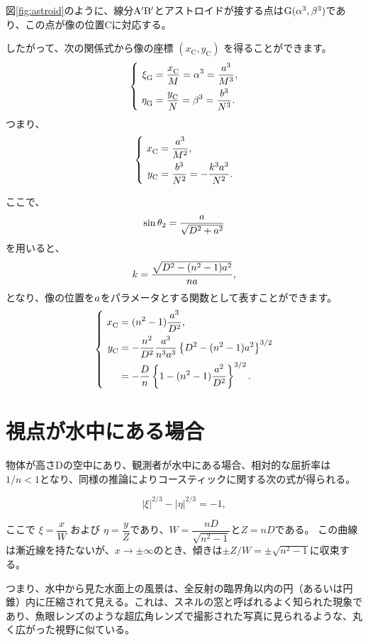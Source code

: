 \documentclass[twocolumn]{article}
\begin{document}
	図\ref{fig:astroid}のように、線分${\mathrm{{A^{\prime}}{B^{\prime}}}}$とアストロイドが接する点は$\mathrm{G}({\alpha}^3, {\beta}^3)$であり、この点が像の位置$\mathrm{C}$に対応する。
	
	したがって、次の関係式から像の座標 $(x_{\mathrm{C}}^{}, y_{\mathrm{C}}^{})$ を得ることができます。
	$$ \left\{ 
	\begin{aligned}
		\xi_{\mathrm{G}}^{} &= \dfrac{x_{\mathrm{C}}^{}}{M} = \greeka^3 = \dfrac{\romana^3}{M^3},\\
		\eta_{\mathrm{G}}^{} &= \dfrac{y_{\mathrm{C}}^{}}{N} = \greekb^3 = \dfrac{\romanb^3}{N^3}.
	\end{aligned}
	\right.$$
	つまり、
	$$ \left\{ 
	\begin{aligned}
		x_{\mathrm{C}}^{} &= \dfrac{\romana^3}{M^2},\\
		y_{\mathrm{C}}^{} &= \dfrac{\romanb^3}{N^2}=-\dfrac{k^3\romana^3}{N^2}.
	\end{aligned}
	\right.$$
	
	ここで、
	$$\sin\theta_2 = \dfrac{{a}}{\sqrt{D^2+{a}^2}}$$
	を用いると、
	$$k = \dfrac{\sqrt{D^2-(n^2-1){a}^2}}{n{a}},$$
	となり、像の位置を${a}$をパラメータとする関数として表すことができます。
	$$ \left\{ 
	\begin{aligned}
		x_{\mathrm{C}}^{} &= (n^2-1)\dfrac{\romana^3}{D^2},\\
		y_{\mathrm{C}}^{} &= -\dfrac{n^2}{D^2}\dfrac{\romana^3}
		{n^3\romana^3}\left\{ D^2-(n^2-1)\romana^2 \right\}^{3/2}\\
		&=-\dfrac{D}{n}\left\{ 1-(n^2-1)\dfrac{\romana^2}{D^2} \right\}^{3/2}.
	\end{aligned}
	\right.$$
	
	\section{視点が水中にある場合}
	
	物体が高さDの空中にあり、観測者が水中にある場合、相対的な屈折率は$1/n < 1$となり、同様の推論によりコースティックに関する次の式が得られる。
	
	$$ \left| \xi \right|^{2/3} - \left| \eta \right|^{2/3} = -1, $$
	
	ここで $\xi = \dfrac{x}{W} $ および $\eta = \dfrac{y}{Z}$であり、$W = \dfrac{nD}{\sqrt{n^2-1}}$と$Z = nD$である。	
	この曲線は漸近線を持たないが、$x \to \pm\infty$のとき、傾きは$\pm Z/W = \pm \sqrt{n^2-1}$に収束する。
	
	つまり、水中から見た水面上の風景は、全反射の臨界角以内の円（あるいは円錐）内に圧縮されて見える。これは、スネルの窓と呼ばれるよく知られた現象であり、魚眼レンズのような超広角レンズで撮影された写真に見られるような、丸く広がった視野に似ている。
	
\end{document}
